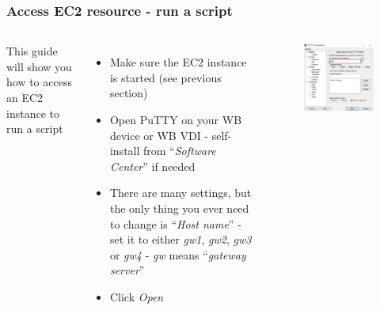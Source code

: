 \documentclass[aspectratio=169]{beamer} %
\begin{document}
\begin{frame}
	\frametitle{Access EC2 resource - run a script}
	\begin{columns}[c]
		This guide will show you how to access an EC2 instance to run a script
		\begin{itemize}
			\item Make sure the EC2 instance is started (see previous section)
			\item Open PuTTY on your WB device or WB VDI
			- self-install from ``\textit{Software Center}'' if needed
			\item There are many settings,
			but the only thing you ever need to change is ``\textit{Host name}''
			- set it to either \textit{gw1}, \textit{gw2}, \textit{gw3} or \textit{gw4}
			- \textit{gw} means ``\textit{gateway server}''
			\item Click \textit{Open} 
		\end{itemize}

		\begin{figure}
			\centering
			\includegraphics[width=\textwidth]{./img/access-1.png}
		\end{figure}

	\end{columns}
\end{frame}
\end{document}
